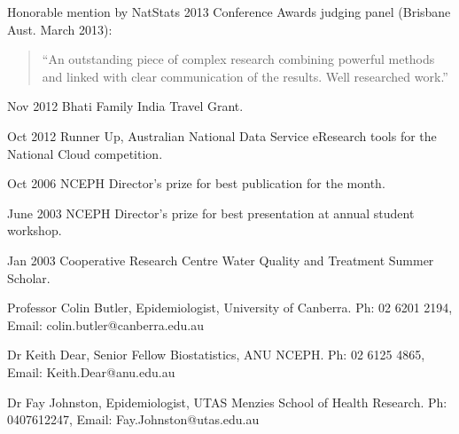 \documentclass[a4paper,11pt]{article}
\begin{document}
\renewcommand{\labelenumi}{\textsc{m}\theenumi.}
\medskip  
\begin{revnumerate}
\item Honorable mention by NatStats 2013 Conference Awards judging panel (Brisbane Aust. March 2013):

\begin{quote}
“An outstanding piece of complex research combining powerful methods and linked with clear communication of the results. Well researched work.”
\end{quote}

\item Nov 2012 Bhati Family India Travel Grant.

\item Oct 2012 Runner Up, Australian National Data Service eResearch tools for the National Cloud competition.

\item Oct 2006 NCEPH Director’s prize for best publication for the month.

\item June 2003 NCEPH Director’s prize for best presentation at annual student workshop.

\item Jan 2003 Cooperative Research Centre Water Quality and Treatment Summer Scholar.
\end{revnumerate}
\bigskip 


\medskip

\medskip
\renewcommand{\labelenumi}{\textsc{n}\theenumi.}
\begin{revnumerate}

\item Professor Colin Butler, Epidemiologist, University of Canberra. Ph: 02 6201 2194, Email: colin.butler@canberra.edu.au

\item Dr Keith Dear, Senior Fellow Biostatistics, ANU NCEPH.  Ph: 02 6125 4865, Email: Keith.Dear@anu.edu.au

\item Dr Fay Johnston, Epidemiologist, UTAS Menzies School of Health Research. Ph: 0407612247, Email: Fay.Johnston@utas.edu.au
\end{revnumerate}
\end{document}

